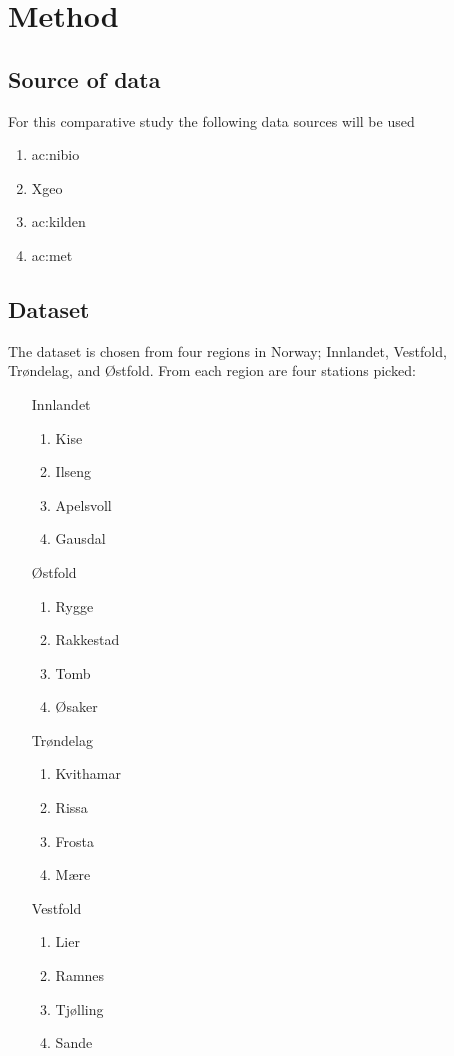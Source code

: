 \section{Method}

\subsection{Source of data}

For this comparative study the following data sources will be used
\begin{enumerate}
	\item \gls{ac:nibio}
	\item Xgeo
	\item \gls{ac:kilden}
	\item \gls{ac:met}
\end{enumerate}

\subsection{Dataset}

The dataset is chosen from four regions in Norway; Innlandet, Vestfold, Trøndelag, and Østfold. From each region are four stations picked:
\begin{multicols}{2}
\begin{itemize}
	\item[Innlandet] \begin{enumerate}
		\item Kise
		\item Ilseng
		\item Apelsvoll
		\item Gausdal
	\end{enumerate}
	\item[Østfold] \begin{enumerate}
		\item Rygge
		\item Rakkestad
		\item Tomb
		\item Øsaker
	\end{enumerate}
	\item[Trøndelag] \begin{enumerate}
		\item Kvithamar
		\item Rissa
		\item Frosta
		\item Mære
	\end{enumerate}
	\item[Vestfold] \begin{enumerate}
		\item Lier
		\item Ramnes
		\item Tjølling
		\item Sande
	\end{enumerate}
\end{itemize}
\end{multicols}

